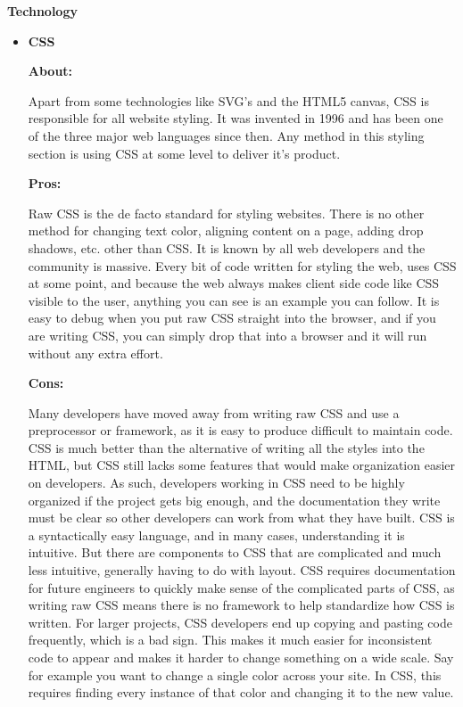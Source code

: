\documentclass[draftclsnofoot,onecolumn,letterpaper,10pt]{IEEEtran}
\begin{document}
	\textbf{Technology}
		\begin{itemize}
			\item{\textbf{CSS}}

				\textbf{About:}

				Apart from some technologies like SVG's and the HTML5 canvas, CSS is responsible for all website styling.
				It was invented in 1996 and has been one of the three major web languages since then.
				Any method in this styling section is using CSS at some level to deliver it's product.\cite{CSSHistory}

				\noindent \textbf{Pros:}

				Raw CSS is the de facto standard for styling websites.
				There is no other method for changing text color, aligning content on a page, adding drop shadows, etc. other than CSS.
				It is known by all web developers and the community is massive.
				Every bit of code written for styling the web, uses CSS at some point, and because the web always makes client side code like CSS visible to the user, anything you can see is an example you can follow.
				It is easy to debug when you put raw CSS straight into the browser, and if you are writing CSS, you can simply drop that into a browser and it will run without any extra effort.\cite{CSSProCon}

				\noindent \textbf{Cons:}

				Many developers have moved away from writing raw CSS and use a preprocessor or framework, as it is easy to produce difficult to maintain code.
				CSS is much better than the alternative of writing all the styles into the HTML, but CSS still lacks some features that would make organization easier on developers.
				As such, developers working in CSS need to be highly organized if the project gets big enough, and the documentation they write must be clear so other developers can work from what they have built.
				CSS is a syntactically easy language, and in many cases, understanding it is intuitive.
				But there are components to CSS that are complicated and much less intuitive, generally having to do with layout.\cite{CSSProCon}
				CSS requires documentation for future engineers to quickly make sense of the complicated parts of CSS, as writing raw CSS means there is no framework to help standardize how CSS is written.
				For larger projects, CSS developers end up copying and pasting code frequently, which is a bad sign.
				This makes it much easier for inconsistent code to appear and makes it harder to change something on a wide scale.
				Say for example you want to change a single color across your site.
				In CSS, this requires finding every instance of that color and changing it to the new value.


\end{itemize}
\end{document}

